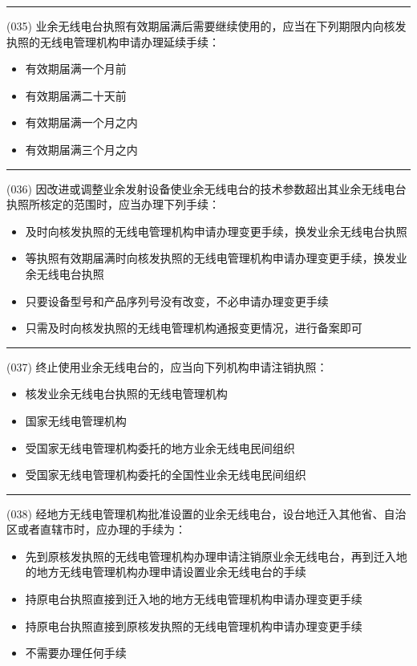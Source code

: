 \documentclass[twocolumn]{ctexart}  %
\begin{document}
\noindent\rule{0.5\textwidth}{1pt}
\heiti (035) 业余无线电台执照有效期届满后需要继续使用的，应当在下列期限内向核发执照的无线电管理机构申请办理延续手续： \songti {\color{gray} [LK0044] }
\begin{itemize}
	\item  有效期届满一个月前
	\item  有效期届满二十天前
	\item  有效期届满一个月之内
	\item  有效期届满三个月之内
\end{itemize}


\noindent\rule{0.5\textwidth}{1pt}
\heiti (036) 因改进或调整业余发射设备使业余无线电台的技术参数超出其业余无线电台执照所核定的范围时，应当办理下列手续： \songti {\color{gray} [LK0045] }
\begin{itemize}
	\item  及时向核发执照的无线电管理机构申请办理变更手续，换发业余无线电台执照
	\item  等执照有效期届满时向核发执照的无线电管理机构申请办理变更手续，换发业余无线电台执照
	\item  只要设备型号和产品序列号没有改变，不必申请办理变更手续
	\item  只需及时向核发执照的无线电管理机构通报变更情况，进行备案即可
\end{itemize}


\noindent\rule{0.5\textwidth}{1pt}
\heiti (037) 终止使用业余无线电台的，应当向下列机构申请注销执照： \songti {\color{gray} [LK0046] }
\begin{itemize}
	\item  核发业余无线电台执照的无线电管理机构
	\item  国家无线电管理机构
	\item  受国家无线电管理机构委托的地方业余无线电民间组织
	\item  受国家无线电管理机构委托的全国性业余无线电民间组织
\end{itemize}


\noindent\rule{0.5\textwidth}{1pt}
\heiti (038) 经地方无线电管理机构批准设置的业余无线电台，设台地迁入其他省、自治区或者直辖市时，应办理的手续为： \songti {\color{gray} [LK0089] }
\begin{itemize}
	\item  先到原核发执照的无线电管理机构办理申请注销原业余无线电台，再到迁入地的地方无线电管理机构办理申请设置业余无线电台的手续
	\item  持原电台执照直接到迁入地的地方无线电管理机构申请办理变更手续
	\item  持原电台执照直接到原核发执照的无线电管理机构申请办理变更手续
	\item  不需要办理任何手续
\end{itemize}
\end{document}
